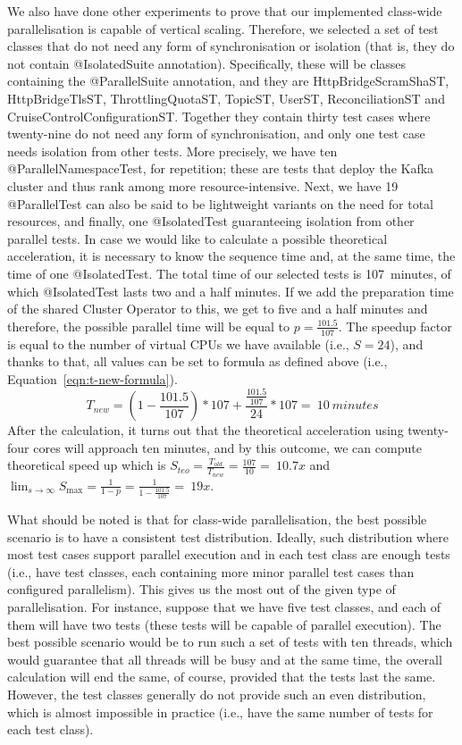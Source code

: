 We also have done other experiments to prove that our implemented class-wide parallelisation is capable of vertical scaling.
Therefore, we selected a set of test classes that do not need any form of synchronisation or isolation (that is, they do not contain @IsolatedSuite annotation).
Specifically, these will be classes containing the @ParallelSuite annotation, and they are HttpBridgeScramShaST, HttpBridgeTlsST,
ThrottlingQuotaST, TopicST, UserST, ReconciliationST and CruiseControlConfigurationST.
Together they contain thirty test cases where twenty-nine do not need any form of synchronisation, and only one test case needs isolation from other tests.
More precisely, we have ten @ParallelNamespaceTest, for repetition;
these are tests that deploy the Kafka cluster and thus rank among more resource-intensive.
Next, we have 19 @ParallelTest can also be said to be lightweight variants on the need for total resources, and finally, one @IsolatedTest
guaranteeing isolation from other parallel tests.
In case we would like to calculate a possible theoretical acceleration, it is necessary to know the sequence time and, at the same time, the time of one @IsolatedTest.
The total time of our selected tests is 107~minutes, of which @IsolatedTest lasts two and a half minutes.
If we add the preparation time of the shared Cluster Operator to this, we get to five and a half minutes and therefore, the possible parallel time will be equal to $p = \frac{101.5}{107}$.
The speedup factor is equal to the number of virtual CPUs we have available (i.e., $S = 24$), and thanks to that, all values can be set to
formula as defined above (i.e., Equation~\eqref {eqn:t-new-formula}).
\begin{equation}
    \label{eqn:class-wide-time-ocp}
    T_{new} = (1 - \frac{101.5}{107}) * 107 +  \frac{\frac{101.5}{107}}{24} * 107 =~10~minutes
    \tag{6}
\end{equation}
After the calculation, it turns out that the theoretical acceleration using twenty-four cores will approach ten minutes,
and by this outcome, we can compute theoretical speed up which is $S_{teo} = \frac{T_{old}}{T_{new}} = \frac{107}{10} =~10.7x$
and $\lim_{s\to\infty} S_{\max} = \frac{1}{1-p} = \frac{1}{1-\frac{101.5}{107}} =~19x$.

What should be noted is that for class-wide parallelisation, the best possible scenario is to have a consistent test distribution.
Ideally, such distribution where most test cases support parallel execution and in each test class are enough tests
(i.e., have test classes, each containing more minor parallel test cases than configured parallelism).
This gives us the most out of the given type of parallelisation.
For instance, suppose that we have five test classes, and each of them will have two tests (these tests will be capable of parallel execution).
The best possible scenario would be to run such a set of tests with ten threads,
which would guarantee that all threads will be busy and at the same time, the overall calculation will end the same,
of course, provided that the tests last the same.
However, the test classes generally do not provide such an even distribution, which is almost impossible in practice
(i.e., have the same number of tests for each test class).

